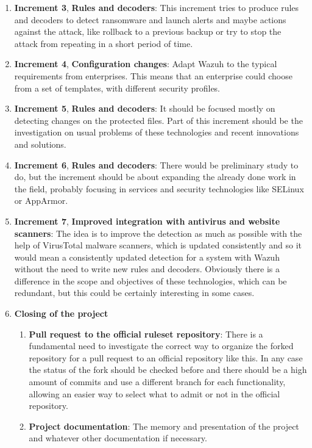 \begin{enumerate}
	\item \textbf{Increment 3}, \textbf{Rules and decoders}: This increment tries to produce rules and decoders to detect ransomware and launch alerts and maybe actions against the attack, like rollback to a previous backup or try to stop the attack from repeating in a short period of time.

	\item \textbf{Increment 4}, \textbf{Configuration changes}: Adapt Wazuh to the typical requirements from enterprises. This means that an enterprise could choose from a set of templates, with different security profiles.

	\item \textbf{Increment 5}, \textbf{Rules and decoders}: It should be focused mostly on detecting changes on the protected files. Part of this increment should be the investigation on usual problems of these technologies and recent innovations and solutions.

	\item \textbf{Increment 6}, \textbf{Rules and decoders}: There would be preliminary study to do, but the increment should be about expanding the already done work in the field, probably focusing in services and security technologies like SELinux or AppArmor.

	\item \textbf{Increment 7}, \textbf{Improved integration with antivirus and website scanners}: The idea is to improve the detection as much as possible with the help of VirusTotal malware scanners, which is updated consistently and so it would mean a consistently updated detection for a system with Wazuh without the need to write new rules and decoders. Obviously there is a difference in the scope and objectives of these technologies, which can be redundant, but this could be certainly interesting in some cases.

	\item \textbf{Closing of the project}
	\begin{enumerate}[label=\alph*]
		\item \textbf{Pull request to the official ruleset repository}: There is a fundamental need to investigate the correct way to organize the forked repository for a pull request to an official repository like this. In any case the status of the fork should be checked before and there should be a high amount of commits and use a different branch for each functionality, allowing an easier way to select what to admit or not in the official repository.
		\item \textbf{Project documentation}: The memory and presentation of the project and whatever other documentation if necessary.
	\end{enumerate}
\end{enumerate}







